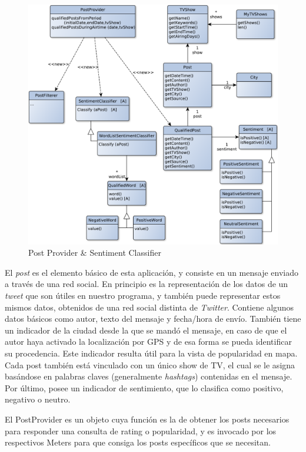 \begin{figure}[H]
\centering
\includegraphics[width=\textwidth]{graph/clase/classifier.pdf}
\caption{Post Provider \& Sentiment Classifier}
\end{figure}

El \emph{post} es el elemento básico de esta aplicación, y consiste en un mensaje enviado a través de una red social. En principio es la representación de los datos de un \emph{tweet} que son útiles en nuestro programa, y también puede representar estos mismos datos, obtenidos de una red social distinta de \emph{Twitter}. Contiene algunos datos básicos como autor, texto del mensaje y fecha/hora de envío. También tiene un indicador de la ciudad desde la que se mandó el mensaje, en caso de que el autor haya activado la localización por GPS y de esa forma se pueda identificar su procedencia. Este indicador resulta útil para la vista de popularidad en mapa. Cada post también está vinculado con un único show de TV, el cual se le asigna basándose en palabras claves (generalmente \emph{hashtags}) contenidas en el mensaje. Por último, posee un indicador de sentimiento, que lo clasifica como positivo, negativo o neutro.
\medskip

El PostProvider es un objeto cuya función es la de obtener los posts necesarios para responder una consulta de rating o popularidad, y es invocado por los respectivos Meters para que consiga los posts específicos que se necesitan.
\medskip

